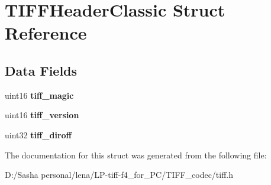 \hypertarget{struct_t_i_f_f_header_classic}{}\section{T\+I\+F\+F\+Header\+Classic Struct Reference}
\label{struct_t_i_f_f_header_classic}
\subsection*{Data Fields}
\begin{DoxyCompactItemize}
\item 
\hypertarget{struct_t_i_f_f_header_classic_ac73e530bcf1587e88771c5806cfa6504}{}uint16 {\bfseries tiff\+\_\+magic}\label{struct_t_i_f_f_header_classic_ac73e530bcf1587e88771c5806cfa6504}

\item 
\hypertarget{struct_t_i_f_f_header_classic_a86111434332ba79982db1a0e14d592e5}{}uint16 {\bfseries tiff\+\_\+version}\label{struct_t_i_f_f_header_classic_a86111434332ba79982db1a0e14d592e5}

\item 
\hypertarget{struct_t_i_f_f_header_classic_af2fe4b247a76e003518eb1a4cd6cf922}{}uint32 {\bfseries tiff\+\_\+diroff}\label{struct_t_i_f_f_header_classic_af2fe4b247a76e003518eb1a4cd6cf922}

\end{DoxyCompactItemize}


The documentation for this struct was generated from the following file\+:\begin{DoxyCompactItemize}
\item 
D\+:/\+Sasha personal/lena/\+L\+P-\/tiff-\/f4\+\_\+for\+\_\+\+P\+C/\+T\+I\+F\+F\+\_\+codec/tiff.\+h\end{DoxyCompactItemize}
